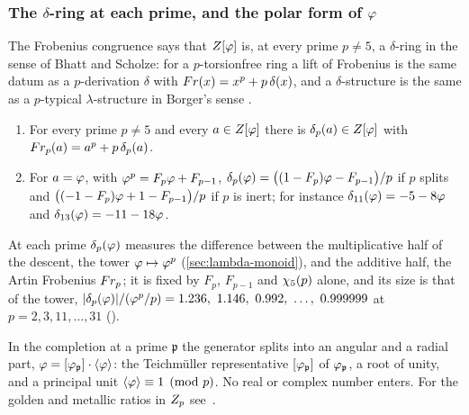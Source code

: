 \subsubsection{The $\delta$-ring at each prime, and the polar form of $\varphi$}\label{ssec:delta-polar}

The Frobenius congruence says that $Z[\varphi]$ is, at every prime $p\neq5$, a $\delta$-ring in the
sense of Bhatt and Scholze: for a $p$-torsionfree ring a lift of Frobenius is the same datum as a $p$-derivation $\delta$ with $Fr(x)=x^p+p\,\delta(x)$, and a $\delta$-structure is the same as a
$p$-typical $\lambda$-structure in Borger's sense \cite[Remarks~2.2--2.3]{bhattscholze22}.

\begin{proposition}\label{prop:delta-ring}
\begin{enumerate}[label=\textup{(\roman*)}]
  \item For every prime $p\neq5$ and every $a\in Z[\varphi]$ there is $\delta_p(a)\in Z[\varphi]$ with $Fr_p(a)=a^p+p\,\delta_p(a)$.
  \item For $a=\varphi$, with $\varphi^p=F_p\varphi+F_{p-1}$, $\delta_p(\varphi)=\bigl((1-F_p)\varphi-F_{p-1}\bigr)/p$ if
    $p$ splits and $\bigl((-1-F_p)\varphi+1-F_{p-1}\bigr)/p$ if $p$ is inert; for instance
    $\delta_{11}(\varphi)=-5-8\varphi$ and $\delta_{13}(\varphi)=-11-18\varphi$.
\end{enumerate}
\end{proposition}

At each prime $\delta_p(\varphi)$ measures the difference between the multiplicative half of the
descent, the tower $\varphi\mapsto\varphi^p$ (\cref{sec:lambda-monoid}), and the additive half, the Artin Frobenius $Fr_p$; it is fixed by $F_p$, $F_{p-1}$ and $\chi_5(p)$ alone, and its size is that of the tower,
$|\delta_p(\golden)|/(\golden^p/p)=1.236,\ 1.146,\ 0.992,\ \ldots,\ 0.999999$ at $p=2,3,11,\ldots,31$ ().

In the completion at a prime $\mathfrak p$ the generator splits into an angular and a radial part,
$\varphi=[\varphi_{\mathfrak p}]\cdot\langle\varphi\rangle$: the Teichm\"uller representative $[\varphi_{\mathfrak p}]$ of
$\varphi_{\mathfrak p}$, a root of unity,
and a principal unit $\langle\varphi\rangle\equiv1\pmod p$.  No real or complex number enters.  For the golden and metallic ratios in $Z_p$ see~\cite{akbiyik19}.

